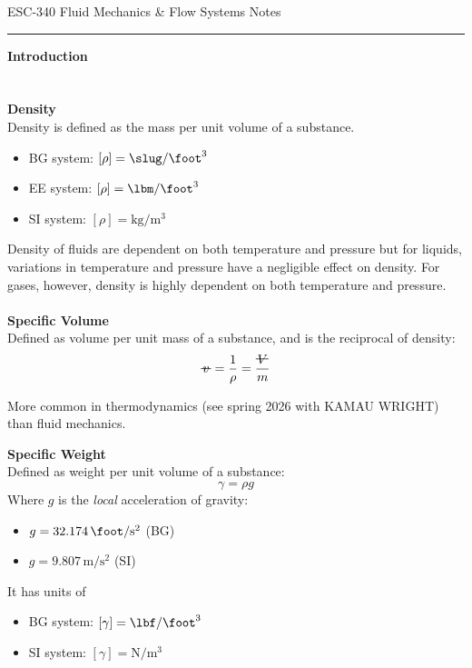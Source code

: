﻿\documentclass[12pt]{article}
\newcommand{\vol}{\mathord{\text{\ooalign{\hidewidth $V$\hidewidth\cr\kern-0.5pt\raisebox{0.8ex}{\rule[0pt]{1em}{0.5pt}}}}}}
\newcommand{\svol}{%
  \mathord{\text{\ooalign{%
    \hfil$v$\hfil\cr
    \hfil\rule[0.6ex]{0.8em}{0.5pt}\hfil
  }}}%
}
\begin{document}
\begin{center}
{\LARGE ESC-340 Fluid Mechanics \& Flow Systems Notes\par}
\end{center}
\hrule
\vspace{1.5em}
\begin{center}
    {\LARGE\bfseries Introduction\par}
\end{center}
\section*{}
\textbf{Density}\\
Density is defined as the mass per unit volume of a substance.
\begin{itemize}
    \item BG system: $[\rho] = \unit{\slug\per\cubic\foot}$
    \item EE system: $[\rho] = \unit{\lbm\per\cubic\foot}$
    \item SI system: $[\rho] = \unit{\kilogram\per\cubic\meter}$
\end{itemize}
Density of fluids are dependent on both temperature and pressure but for liquids, variations in temperature and pressure have a negligible effect on density. For gases, however, density is highly dependent on both temperature and pressure.\\\\
\textbf{Specific Volume}\\
Defined as volume per unit mass of a substance, and is the reciprocal of density:
\[\svol = \frac{1}{\rho} = \frac{\vol}{m}\]
\begin{notebox}
More common in thermodynamics (see spring 2026 with KAMAU WRIGHT) than fluid mechanics.
\end{notebox}
\textbf{Specific Weight}\\
Defined as weight per unit volume of a substance:
\[\gamma = \rho g\]
Where $g$ is the \textit{local} acceleration of gravity:
\begin{itemize}
    \item $g = 32.174\,\unit{\foot\per\second\squared}$ (BG)
    \item $g = 9.807\,\unit{\meter\per\second\squared}$ (SI)
\end{itemize}
It has units of 
\begin{itemize}
    \item BG system: $[\gamma] = \unit{\lbf\per\cubic\foot}$
    \item SI system: $[\gamma] = \unit{\newton\per\cubic\meter}$
\end{itemize}
\end{document}
